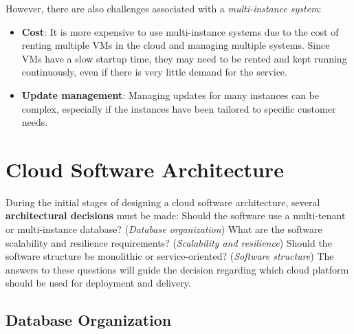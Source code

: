 \noindent
However, there are also challenges associated with a \textit{multi-instance system}:
\begin{itemize}
    \item \textbf{Cost}: It is more expensive to use multi-instance systems due to the cost of renting multiple VMs in the cloud and managing multiple systems. Since VMs have a slow startup time, they may need to be rented and kept running continuously, even if there is very little demand for the service. 
    \item \textbf{Update management}: Managing updates for many instances can be complex, especially if the instances have been tailored to specific customer needs.
\end{itemize}

\section{Cloud Software Architecture}

During the initial stages of designing a cloud software architecture, several \textbf{architectural decisions} must be made: Should the software use a multi-tenant or multi-instance database? (\emph{Database organization}) What are the software scalability and resilience requirements? (\emph{Scalability and resilience}) Should the software structure be monolithic or service-oriented? (\emph{Software structure}) The answers to these questions will guide the decision regarding which cloud platform should be used for deployment and delivery.

\subsection{Database Organization}

